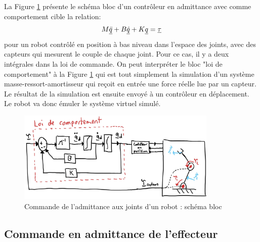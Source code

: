 La Figure \ref{fig:admitancecontroljointspace} présente le schéma bloc d'un contrôleur en admittance avec comme comportement cible la relation:
\begin{align}
	M \underline{\ddot{q}} + B \underline{\dot{q}} + K \underline{q} = \underline{\tau}
\end{align}
pour un robot contrôlé en position à bas niveau dans l'espace des joints, avec des capteurs qui mesurent le couple de chaque joint. Pour ce cas, il y a deux intégrales dans la loi de commande. On peut interpréter le bloc "loi de comportement" à la Figure \ref{fig:admitancecontroljointspace} qui est tout simplement la simulation d'un système masse-ressort-amortisseur qui reçoit en entrée une force réelle lue par un capteur. Le résultat de la simulation est ensuite envoyé à un contrôleur en déplacement. Le robot va donc émuler le système virtuel simulé.
\begin{figure}[h]
	\centering
	\includegraphics[width=0.85\textwidth]{fig/admitancecontroljointspace.jpg}
	\caption{Commande de l'admittance aux joints d'un robot : schéma bloc}
	\label{fig:admitancecontroljointspace}
\end{figure}



\subsection{Commande en admittance de l'effecteur}
\label{sec:effadmcontrol}

